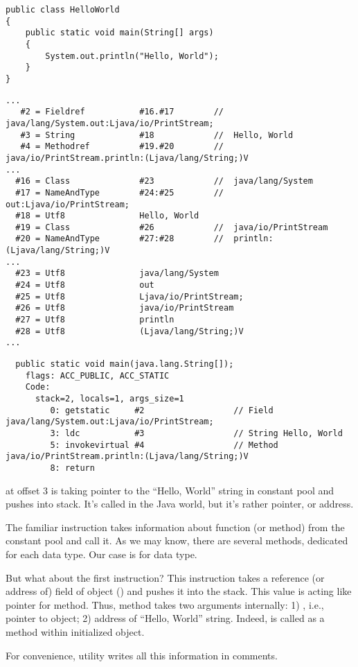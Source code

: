 \begin{lstlisting}
public class HelloWorld
{
	public static void main(String[] args)
	{
		System.out.println("Hello, World");
	}
}
\end{lstlisting}

\begin{lstlisting}[caption=Constant pool]
...
   #2 = Fieldref           #16.#17        //  java/lang/System.out:Ljava/io/PrintStream;
   #3 = String             #18            //  Hello, World
   #4 = Methodref          #19.#20        //  java/io/PrintStream.println:(Ljava/lang/String;)V
...
  #16 = Class              #23            //  java/lang/System
  #17 = NameAndType        #24:#25        //  out:Ljava/io/PrintStream;
  #18 = Utf8               Hello, World
  #19 = Class              #26            //  java/io/PrintStream
  #20 = NameAndType        #27:#28        //  println:(Ljava/lang/String;)V
...
  #23 = Utf8               java/lang/System
  #24 = Utf8               out
  #25 = Utf8               Ljava/io/PrintStream;
  #26 = Utf8               java/io/PrintStream
  #27 = Utf8               println
  #28 = Utf8               (Ljava/lang/String;)V
...
\end{lstlisting}

\begin{lstlisting}
  public static void main(java.lang.String[]);
    flags: ACC_PUBLIC, ACC_STATIC
    Code:
      stack=2, locals=1, args_size=1
         0: getstatic     #2                  // Field java/lang/System.out:Ljava/io/PrintStream;
         3: ldc           #3                  // String Hello, World
         5: invokevirtual #4                  // Method java/io/PrintStream.println:(Ljava/lang/String;)V
         8: return        
\end{lstlisting}

 at offset 3 is taking pointer to the ``Hello, World'' string in constant pool 
and pushes into stack.
It's called  in the Java world, but it's rather pointer, or address.

The familiar  instruction takes information about  function (or method) 
from the constant pool and call it.
As we may know, there are several  methods, dedicated for each data type.
Our case is  for  data type.

But what about the first  instruction?
This instruction takes a reference (or address of) field of object () 
and pushes it into the stack.
This value is acting like  pointer for  method.
Thus,  method takes two arguments internally:
1) , i.e., pointer to object; 
2) address of ``Hello, World'' string.
Indeed,  is called as a method within initialized  object.

For convenience,  utility writes all this information in comments.
